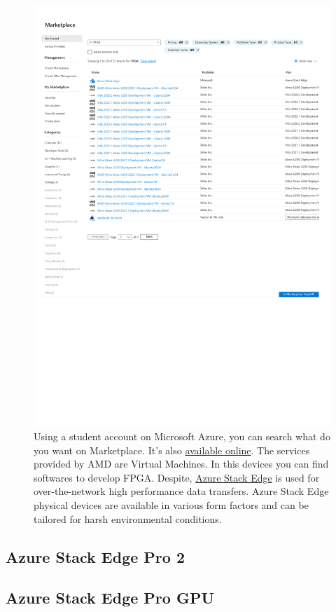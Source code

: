\documentclass[a4paper]{article}
\begin{document}
    \begin{figure}[!htp]
        \centering
        \includegraphics[width=\textwidth]{img/Marketplace FPGA - Microsoft Azure.pdf}
        \caption{Using a student account on Microsoft Azure, you can search what do you want on Marketplace. It's also \href{https://azuremarketplace.microsoft.com/en/marketplace/apps?search=fpga&page=1}{available online}. The services provided by AMD are Virtual Machines. In this devices you can find softwares to develop FPGA. Despite, \href{https://azuremarketplace.microsoft.com/en/marketplace/apps/Microsoft.DataBoxEdge?tab=Overview}{Azure Stack Edge} is used for over-the-network high performance data transfers. Azure Stack Edge physical devices are available in various form factors and can be tailored for harsh environmental conditions.}
    \end{figure}

    \newpage

    \subsection{Azure Stack Edge Pro 2}\label{subsection: azure stack edge pro 2}

    \newpage

    \subsection{Azure Stack Edge Pro GPU}\label{subsection: azure stack edge pro gpu}
\end{document}
